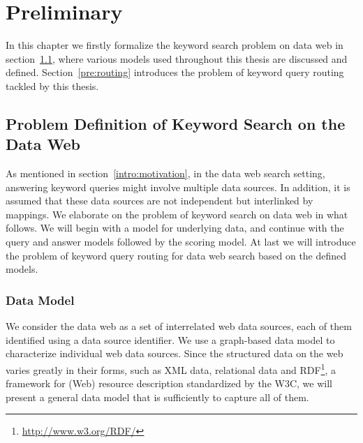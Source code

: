 \chapter{Preliminary}\label{pre}

In this chapter we firstly formalize the keyword search problem on data web in
section~\ref{pre:ksdw}, where various models used throughout this thesis are discussed and defined.
Section~\ref{pre:routing} introduces the problem of keyword query routing tackled by this thesis.

\section{Problem Definition of Keyword Search on the Data Web}\label{pre:ksdw}

As mentioned in section~\ref{intro:motivation}, in the data web search setting, answering keyword
queries might involve multiple data sources. In addition, it is assumed that these data sources are
not independent but interlinked by mappings. We elaborate on the problem of keyword search
on data web in what follows. We will begin with a model for underlying data, and continue with the
query and answer models followed by the scoring model. At last we will introduce the problem of
keyword query routing for data web search based on the defined models.

\subsection{Data Model} 

We consider the data web as a set of interrelated web data sources, each of them identified using a
data source identifier. We use a graph-based data model to characterize individual web data sources.
Since the structured data on the web varies greatly in their forms, such as XML data, relational data
and RDF\footnote{\url{http://www.w3.org/RDF/}}, a framework for (Web) resource description
standardized by the W3C, we will present a general data model that is sufficiently to capture all of
them.

